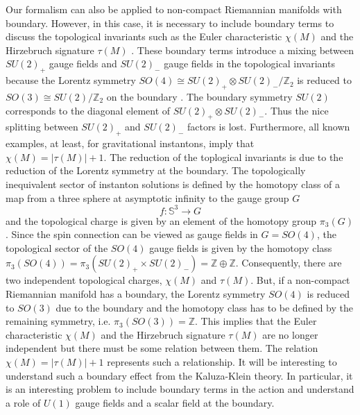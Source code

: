 \documentclass[12pt,epsf]{article}
\begin{document}
Our formalism can also be applied to non-compact Riemannian manifolds with boundary.
However, in this case, it is necessary to include boundary terms to discuss the topological invariants
such as the Euler characteristic $\chi(M)$ and the Hirzebruch signature $\tau(M)$ \cite{egh-report,gib-pop,gib-haw,gib-3}.
These boundary terms introduce a mixing between $SU(2)_+$ gauge fields and $SU(2)_-$ gauge fields
in the topological invariants because the Lorentz symmetry $SO(4)\cong SU(2)_+ \otimes SU(2)_-/\mathbb{Z}_2$ is reduced
to $SO(3) \cong SU(2)/\mathbb{Z}_2$ on the boundary \cite{opy-jhep}.
The boundary symmetry $SU(2)$ corresponds to the diagonal element of $SU(2)_+ \otimes SU(2)_-$.
Thus the nice splitting between $SU(2)_+$ and $SU(2)_-$ factors is lost.
Furthermore, all known examples, at least, for gravitational instantons, imply \cite{gib-pop,gib-haw,gib-3}
that $\chi(M) = |\tau(M)| +1$. The reduction of the toplogical invariants is due to the reduction
of the Lorentz symmetry at the boundary.
The topologically inequivalent sector of instanton solutions is defined by the homotopy class of a map
from a three sphere at asymptotic infinity to the gauge group $G$
\begin{equation}\label{homotopy}
f: \mathbb{S}^3 \to G
\end{equation}
and the topological charge is given by an element of the homotopy group $\pi_3 (G)$ \cite{nakahara}.
Since the spin connection  can be viewed as gauge fields in $G=SO(4)$,
the topological sector of the $SO(4)$ gauge fields is given by the homotopy class
$\pi_3 (SO(4)) = \pi_3 (SU(2)_+ \times SU(2)_-) = \mathbb{Z}  \oplus \mathbb{Z}$.
Consequently, there are two independent topological charges, $\chi(M)$ and $\tau(M)$.
But, if a non-compact Riemannian manifold has a boundary, the Lorentz symmetry $SO(4)$
is reduced to $SO(3)$ due to the boundary and the homotopy class has to be defined by
the remaining symmetry, i.e. $\pi_3 (SO(3)) = \mathbb{Z}$.
This implies that the Euler characteristic $\chi(M)$ and the Hirzebruch signature $\tau(M)$ are
no longer independent but there must be some relation between them.
The relation  $\chi(M) = |\tau(M)| +1$ represents such a relationship.
It will be interesting to understand such a boundary effect from the Kaluza-Klein theory.
In particular, it is an interesting problem to include boundary terms in the action 
and understand a role of $U(1)$ gauge fields and a scalar field at the boundary.
\end{document}
